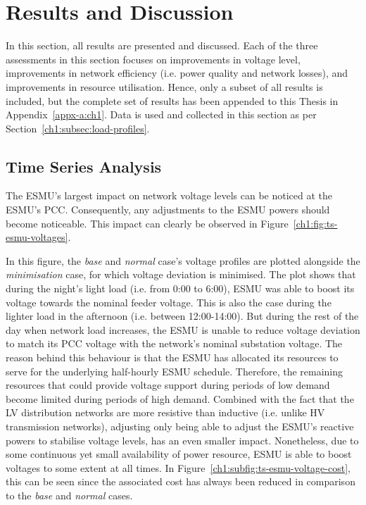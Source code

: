 \section{Results and Discussion}
\label{ch1:sec:results-and-discussion}

In this section, all results are presented and discussed.
Each of the three assessments in this section focuses on improvements in voltage level, improvements in network efficiency (i.e. power quality and network losses), and improvements in resource utilisation.
Hence, only a subset of all results is included, but the complete set of results has been appended to this Thesis in Appendix~\ref{appx-a:ch1}.
Data is used and collected in this section as per Section~\ref{ch1:subsec:load-profiles}.

\subsection{Time Series Analysis}
\label{ch1:subsec:time-series-analysis}

The ESMU's largest impact on network voltage levels can be noticed at the ESMU's PCC.
Consequently, any adjustments to the ESMU powers should become noticeable.
This impact can clearly be observed in Figure~\ref{ch1:fig:ts-esmu-voltages}.



In this figure, the \textit{base} and \textit{normal} case's voltage profiles are plotted alongside the \textit{minimisation} case, for which voltage deviation is minimised.
The plot shows that during the night's light load (i.e. from 0:00 to 6:00), ESMU was able to boost its voltage towards the nominal feeder voltage.
This is also the case during the lighter load in the afternoon (i.e. between 12:00-14:00).
But during the rest of the day when network load increases, the ESMU is unable to reduce voltage deviation to match its PCC voltage with the network's nominal substation voltage.
The reason behind this behaviour is that the ESMU has allocated its resources to serve for the underlying half-hourly ESMU schedule.
Therefore, the remaining resources that could provide voltage support during periods of low demand become limited during periods of high demand.
Combined with the fact that the LV distribution networks are more resistive than inductive (i.e. unlike HV transmission networks), adjusting only being able to adjust the ESMU's reactive powers to stabilise voltage levels, has an even smaller impact.
Nonetheless, due to some continuous yet small availability of power resource, ESMU is able to boost voltages to some extent at all times. In Figure~\ref{ch1:subfig:ts-esmu-voltage-cost}, this can be seen since the associated cost has always been reduced in comparison to the \textit{base} and \textit{normal} cases.

